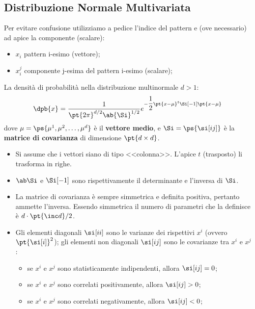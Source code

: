 \subsection{Distribuzione Normale Multivariata}\label{sec:distribuzione_normale_multivariata} %
\begin{note}[Notazione]
    Per evitare confusione utilizziamo a pedice l'indice del pattern e (ove necessario) ad apice la componente (scalare):
    \begin{itemize}
        \item $x_i$ pattern i-esimo (vettore);
        \item $x_i^j$ componente j-esima del pattern i-esimo (scalare);
    \end{itemize}
\end{note}
La densità di probabilità nella distribuzione multinormale $d > 1$:
\[
    \dpb{x} = \dfrac{1}{\pt{2\pi}^{d/2}\ab{\Si}^{1/2}} e^{-\dfrac{1}{2}\pt{x - \mu}^t\Si[-1]\pt{x - \mu}}
\]
dove $\mu = \ps{\mu^1, \mu^2, \dots, \mu^d}$ è il \textbf{vettore medio}, e $\Si = \ps{\si[ij]}$ è la \textbf{matrice di covarianza} di dimensione $\pt{d\times d}$.
\emptyln{}
\begin{itemize}
    \item Si assume che i vettori siano di tipo <<colonna>>. L'apice $t$ (trasposto) li trasforma in righe.
    \item $\ab\Si$ e $\Si[-1]$ sono rispettivamente il determinante e l'inversa di $\Si$.
    \item La matrice di covarianza è sempre simmetrica e definita positiva, pertanto ammette l'inversa.
        Essendo simmetrica il numero di parametri che la definisce è $d\cdot \pt{\inc d} / 2$.
    \item Gli elementi diagonali $\si[ii]$ sono le varianze dei rispettivi $x^i$ (ovvero ${\pt{\si[i]}}^2$); gli elementi non diagonali $\si[ij]$ sono le covarianze tra $x^i$ e $x^j$:
        \begin{itemize}
            \item se $x^i$ e $x^j$ sono statisticamente indipendenti, allora $\si[ij] = 0$;
            \item se $x^i$ e $x^j$ sono correlati positivamente, allora $\si[ij] > 0$;
            \item se $x^i$ e $x^j$ sono correlati negativamente, allora $\si[ij] < 0$;
        \end{itemize}
\end{itemize}
%
